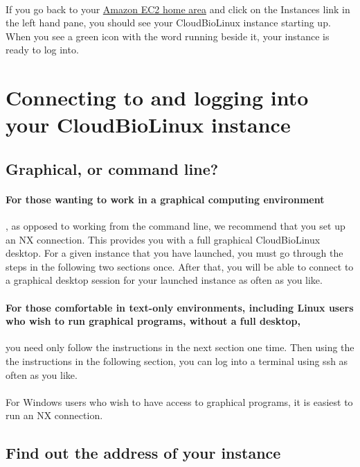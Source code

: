\paragraph{}If you go back to your \href{http://console.aws.amazon.com/ec2/home}{Amazon EC2 home area} and click on the Instances link in the left hand pane, you should see your CloudBioLinux instance starting up. When you see a green icon with the word running beside it, your instance is ready to log into.

\section{Connecting to and logging into your CloudBioLinux instance}

\subsection{Graphical, or command line?}

\paragraph{For those wanting to work in a graphical computing environment}, as opposed to working from the command line, we recommend that you set up an NX connection. This provides you with a full graphical CloudBioLinux desktop. For a given instance that you have launched, you must go through the steps in the following two sections once. After that, you will be able to connect to a graphical desktop session for your launched instance as often as you like.

\paragraph{For those comfortable in text-only environments, including Linux users who wish to run graphical programs, without a full desktop,} you need only follow the instructions in the next section one time. Then using the the instructions in the following section, you can log into a terminal using ssh as often as you like. 

\paragraph{}For Windows users who wish to have access to graphical programs, it is easiest to run an NX connection.  

\subsection{Find out the address of your instance}

